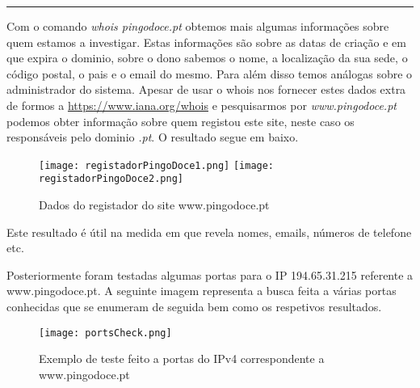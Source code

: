 \noindent\rule{8cm}{0.4pt}

\par Com o comando \textit{whois pingodoce.pt} obtemos mais algumas informações sobre quem estamos a investigar.\newline
Estas informações são sobre as datas de criação e em que expira o dominio, sobre o dono sabemos o nome, a localização da sua sede, o código postal, o pais e o email do mesmo. Para além disso temos análogas sobre o administrador do sistema.\newline
Apesar de usar o whois nos fornecer estes dados extra de formos a \url{https://www.iana.org/whois} e pesquisarmos por \textit{www.pingodoce.pt} podemos obter informação sobre quem registou este site, neste caso os responsáveis pelo dominio \textit{.pt}. O resultado segue em baixo.

\begin{figure}[H]

	\centering

 	\texttt{[image: registadorPingoDoce1.png]}
 	\texttt{[image: registadorPingoDoce2.png]}
 	\caption {Dados do registador do site www.pingodoce.pt}

  	\label{fig01}
\end{figure}


Este resultado é útil na medida em que revela nomes, emails, números de telefone etc.

Posteriormente foram testadas algumas portas para o IP 194.65.31.215 referente a www.pingodoce.pt. A seguinte imagem representa a busca feita a várias portas conhecidas que se enumeram de seguida bem como os respetivos resultados.

\begin{figure}[H]

	\centering

 	\texttt{[image: portsCheck.png]}
 	\caption {Exemplo de teste feito a portas do IPv4 correspondente a www.pingodoce.pt}

  	\label{fig:02}
\end{figure}

